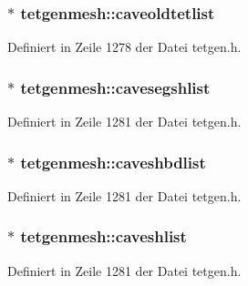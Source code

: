 \hypertarget{classtetgenmesh_ad122f4f5cd32b673b70f620377fb21a9}{
\subsubsection[{caveoldtetlist}]{ $\ast$ tetgenmesh\-::caveoldtetlist}}\label{classtetgenmesh_ad122f4f5cd32b673b70f620377fb21a9}


Definiert in Zeile 1278 der Datei tetgen.\-h.

\hypertarget{classtetgenmesh_ad929399b88bbd740c2e0564031a57c2f}{
\subsubsection[{cavesegshlist}]{ $\ast$ tetgenmesh\-::cavesegshlist}}\label{classtetgenmesh_ad929399b88bbd740c2e0564031a57c2f}


Definiert in Zeile 1281 der Datei tetgen.\-h.

\hypertarget{classtetgenmesh_a57a0a7c4c43288256e149f620d6aeb27}{
\subsubsection[{caveshbdlist}]{ $\ast$ tetgenmesh\-::caveshbdlist}}\label{classtetgenmesh_a57a0a7c4c43288256e149f620d6aeb27}


Definiert in Zeile 1281 der Datei tetgen.\-h.

\hypertarget{classtetgenmesh_afb6512a1f1ac8fa33ccdbf01e41e2612}{
\subsubsection[{caveshlist}]{$\ast$ tetgenmesh\-::caveshlist}}\label{classtetgenmesh_afb6512a1f1ac8fa33ccdbf01e41e2612}


Definiert in Zeile 1281 der Datei tetgen.\-h.

